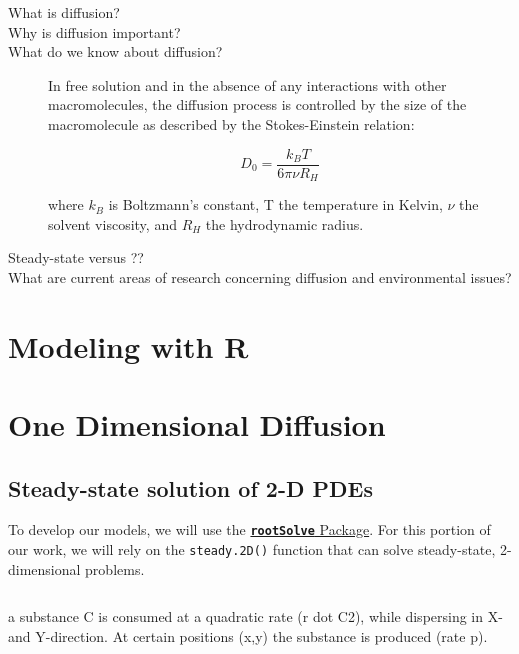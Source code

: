\documentclass{tufte-handout}
\begin{document}
\begin{description}
	\item[What is diffusion?]

	\item[Why is diffusion important?]
	
	\item[What do we know about diffusion?]
	
In free solution and in the absence of any interactions with other macromolecules, the diffusion process is controlled by the size of the macromolecule as described by the Stokes-Einstein relation:

\begin{equation}
D_0 =  \frac{k_B T}{6 \pi \nu R_H}
\end{equation}

where $k_B$ is Boltzmann's constant, T the temperature in Kelvin, $\nu$ the solvent viscosity, and $R_H$ the hydrodynamic radius.

  \item[Steady-state versus ??]
	\item[What are current areas of research concerning diffusion and environmental issues?]
\end{description}


\section{Modeling with R}

\section{One Dimensional Diffusion}


\subsection{Steady-state solution of 2-D PDEs}

To develop our models, we will use the \href{https://cran.r-project.org/web/packages/rootSolve/vignettes/rootSolve.pdf}{\texttt{\textbf{rootSolve}} Package}. For this portion of our work, we will rely on the \texttt{steady.2D()} function that can solve steady-state, 2-dimensional problems.

\begin{equation}
\end{equation}

a substance C is consumed at a quadratic rate (r dot C2), while dispersing in X- and Y-direction.
At certain positions (x,y) the substance is produced (rate p).
\end{document}
